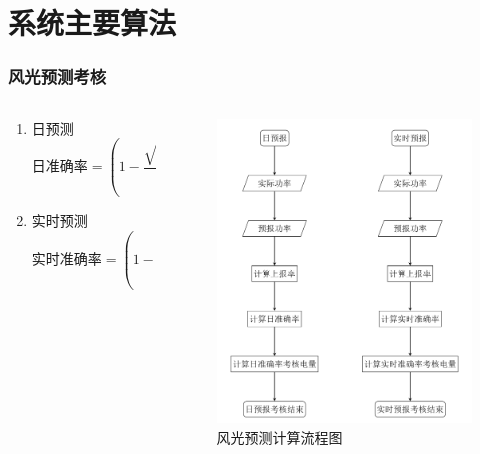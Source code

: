 \documentclass[aspectratio=169, 10pt, utf8, mathserif]{beamer}
\begin{document}
	\section{系统主要算法}
			\begin{frame}
		\frametitle{风光预测考核}
		
		\begin{columns}
			
			\begin{column}{.4\linewidth}
			\begin{enumerate}
				\item 日预测
				\begin{equation}\label{pre_wind_day}
					\texttt{日准确率}=(1-\dfrac{\sqrt{\sum\limits_{i=1}^{n}(P_{Mi}-P_{Pi})^2}}{Cap\sqrt{n}})\nonumber
				\end{equation}
				
				\item 实时预测
				\begin{equation}\label{pre_wind_rt}
					\texttt{实时准确率}=(1-\dfrac{\sqrt{\sum\limits_{i=1}^{n}(P_{Mi}-P_{Pi,t})^2}}{Cap\sqrt{n}})\nonumber
				\end{equation}
				
			\end{enumerate}
			\end{column}
			
			\begin{column}{.6\linewidth}
			\begin{figure}[H]
				\centering
				\includegraphics[width=0.53\linewidth]{pic/screenshot028}
				\caption{风光预测计算流程图}
				\label{fig:screenshot028}
			\end{figure}
			
			\end{column}
		\end{columns}
	\end{frame}
\end{document}
